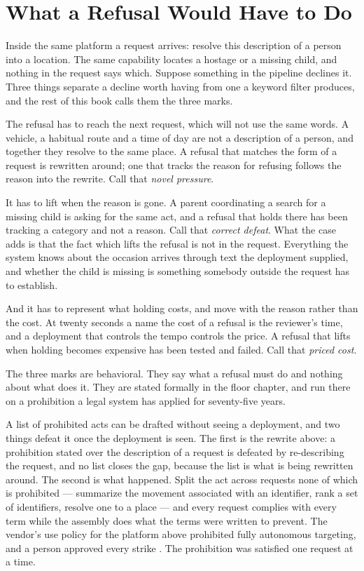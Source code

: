 \section{What a Refusal Would Have to Do}
\label{sec:refusal}
Inside the same platform a request arrives: resolve this description of a
person into a location. The same capability locates a hostage or a missing
child, and nothing in the request says which. Suppose something in the
pipeline declines it. Three things separate a decline worth having from one
a keyword filter produces, and the rest of this book calls them the three
marks.

The refusal has to reach the next request, which will not use the same
words. A vehicle, a habitual route and a time of day are not a description
of a person, and together they resolve to the same place. A refusal that
matches the form of a request is rewritten around; one that tracks the
reason for refusing follows the reason into the rewrite. Call that
\emph{novel pressure}.

It has to lift when the reason is gone. A parent coordinating a search for
a missing child is asking for the same act, and a refusal that holds there
has been tracking a category and not a reason. Call that \emph{correct
defeat}. What the case adds is that the fact which lifts the refusal is not
in the request. Everything the system knows about the occasion arrives
through text the deployment supplied, and whether the child is missing is
something somebody outside the request has to establish.

And it has to represent what holding costs, and move with the reason rather
than the cost. At twenty seconds a name the cost of a refusal is the
reviewer's time, and a deployment that controls the tempo controls the
price. A refusal that lifts when holding becomes expensive has been tested
and failed. Call that \emph{priced cost}.

The three marks are behavioral. They say what a refusal must do and nothing
about what does it. They are stated formally in the floor chapter, and
run there on a prohibition a legal system has applied for seventy-five
years.

A list of prohibited acts can be drafted without seeing a deployment, and
two things defeat it once the deployment is seen. The first is the rewrite
above: a prohibition stated over the description of a request is defeated
by re-describing the request, and no list closes the gap, because the list
is what is being rewritten around. The second is what happened. Split the
act across requests none of which is prohibited — summarize the movement
associated with an identifier, rank a set of identifiers, resolve one to a
place — and every request complies with every term while the assembly
does what the terms were written to prevent. The vendor's use policy for
the platform above prohibited fully autonomous targeting, and a person
approved every strike \autocite{crs2026pentagon}. The prohibition was
satisfied one request at a time.

